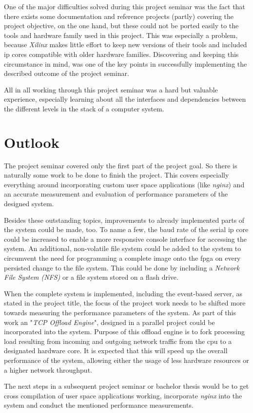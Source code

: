 One of the major difficulties solved during this project seminar was the fact that there exists some documentation and reference projects (partly) covering the project objective, on the one hand, but these could not be ported easily to the tools and hardware family used in this project. This was especially a problem, because \textit{Xilinx} makes little effort to keep new versions of their tools and included \gls{ip} cores compatible with older hardware families. Discovering and keeping this circumstance in mind, was one of the key points in successfully implementing the described outcome of the project seminar.

All in all working through this project seminar was a hard but valuable experience, especially learning about all the interfaces and dependencies between the different levels in the stack of a computer system.

\section{Outlook}

The project seminar covered only the first part of the project goal. So there is naturally some work to be done to finish the project. This covers especially everything around incorporating custom user space applications (like \textit{nginx}) and an accurate measurement and evaluation of performance parameters of the designed system.

Besides these outstanding topics, improvements to already implemented parts of the system could be made, too. To name a few, the baud rate of the serial \gls{ip} core could be increased to enable a more responsive console interface for accessing the system. An additional, non-volatile file system could be added to the system to circumvent the need for programming a complete image onto the \gls{fpga} on every persisted change to the file system. This could be done by including a \textit{Network File System (NFS)} or a file system stored on a flash drive.

When the complete system is implemented, including the event-based server, as stated in the project title, the focus of the project work needs to be shifted more towards measuring the performance parameters of the system. As part of this work an "\textit{TCP Offload Engine}", designed in a parallel project could be incorporated into the system. Purpose of this offload engine is to fork processing load resulting from incoming and outgoing network traffic from the \gls{cpu} to a designated hardware core. It is expected that this will speed up the overall performance of the system, allowing either the usage of less hardware resources or a higher network throughput.

The next steps in a subsequent project seminar or bachelor thesis would be to get  cross compilation of user space applications working, incorporate \textit{nginx} into the system and conduct the mentioned performance measurements.